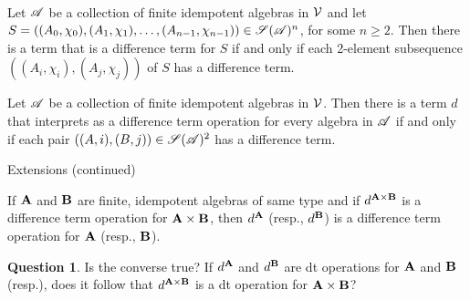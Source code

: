 \documentclass[notes=hide,12pt,xcolor=dvipsnames%
   ]{beamer}
\theoremstyle{definition}
\newtheorem{question}{Question}
\begin{document}
\begin{frame}[label=extensions]{~}

\begin{theorem}
  \label{thm:glob-loc-diff-terms}
  Let $\mathscr{A}$ be a collection of finite idempotent
  algebras in $\mathcal{V}$ and let
  $S= ((A_0, \chi_0), (A_1, \chi_1), \dots, (A_{n-1}, \chi_{n-1}))\in \mathscr{S}(\mathscr{A})^n$,
  for some $n\geq 2$.
  Then there is a term that is a \glocal difference term for $S$
  if and only if each 2-element subsequence $((A_i,\chi_i), (A_j,\chi_j))$ of $S$
  has a \glocal difference term.
\end{theorem}
\pause

\begin{corollary}
  \label{cor:glob-loc-diff-term}
  Let $\mathscr{A}$ be a collection of finite idempotent
  algebras in $\mathcal{V}$. %
  Then there is a term $d$ that interprets as a difference term operation
  for every algebra in $\mathscr{A}$
  if and only if each pair $((A,i), (B,j)) \in \mathscr{S}(\mathscr{A})^2$ has a \glocal
  difference term.
\end{corollary}

\end{frame}


\begin{frame}[label=extensions]{Extensions (continued)}

\begin{lemma}
  \label{lem:products}
  If $\mathbf{A}$ and $\mathbf{B}$ are finite, idempotent algebras of same type
  and if $d^{\mathbf{A} \times \mathbf{B}}$ is a difference term operation for $\mathbf{A}\times \mathbf{B}$,
  then $d^{\mathbf{A}}$ (resp., $d^{\mathbf{B}}$) is a difference term operation for 
  $\mathbf{A}$  (resp., $\mathbf{B}$).
\end{lemma}

\pause
\begin{question}
  Is the converse true? 
  If $d^{\mathbf{A}}$ and $d^{\mathbf{B}}$ are dt operations for 
  $\mathbf{A}$ and $\mathbf{B}$ (resp.), does it follow that $d^{\mathbf{A} \times \mathbf{B}}$
  is a dt operation for $\mathbf{A} \times \mathbf{B}$?
\end{question}
\end{frame}
\end{document}
